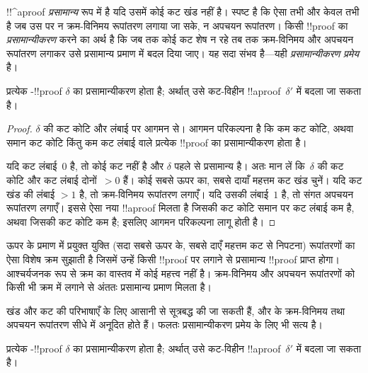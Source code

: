 \documentclass[../../../include/open-logic-section]{subfiles}
\begin{document}


!!^a{proof} \emph{प्रसामान्य} रूप में है यदि उसमें कोई कट खंड नहीं है। स्पष्ट
है कि ऐसा तभी और केवल तभी है जब उस पर न क्रम-विनिमय रूपांतरण लगाया जा सके, न
अपचयन रूपांतरण। किसी !!{proof} का \emph{प्रसामान्यीकरण} करने का अर्थ है कि
जब तक कोई कट शेष न रहे तब तक क्रम-विनिमय और अपचयन रूपांतरण लगाकर उसे
प्रसामान्य प्रमाण में बदल दिया जाए। यह सदा संभव है—यही \emph{प्रसामान्यीकरण
प्रमेय} है।

\begin{thm} प्रत्येक -!!{proof}
$\delta$ का प्रसामान्यीकरण होता है; अर्थात् उसे कट-विहीन
!!a{proof}~$\delta'$ में बदला जा सकता है।
\end{thm}

\begin{proof}
  $\delta$ की कट कोटि और लंबाई पर आगमन से। आगमन परिकल्पना है कि कम कट कोटि,
  अथवा समान कट कोटि किंतु कम कट लंबाई वाले प्रत्येक !!{proof} का
  प्रसामान्यीकरण होता है।

  यदि कट लंबाई~$0$ है, तो कोई कट नहीं है और $\delta$ पहले से प्रसामान्य है।
  अतः मान लें कि~$\delta$ की कट कोटि और कट लंबाई दोनों~$> 0$ हैं। कोई सबसे
  ऊपर का, सबसे दायाँ महत्तम कट खंड चुनें। यदि कट खंड की लंबाई $>1$ है, तो
  क्रम-विनिमय रूपांतरण लगाएँ। यदि उसकी लंबाई~$1$ है, तो संगत अपचयन रूपांतरण
  लगाएँ। इससे ऐसा नया !!a{proof} मिलता है जिसकी कट कोटि समान पर कट लंबाई कम
  है, अथवा जिसकी कट कोटि कम है; इसलिए आगमन परिकल्पना लागू होती है।
\end{proof}

ऊपर के प्रमाण में प्रयुक्त युक्ति (सदा सबसे ऊपर के, सबसे दाएँ महत्तम कट से
निपटना) रूपांतरणों का ऐसा विशेष क्रम सुझाती है जिसमें उन्हें किसी !!{proof}
पर लगाने से प्रसामान्य !!{proof} प्राप्त होगा। आश्चर्यजनक रूप से क्रम का
वास्तव में कोई महत्त्व नहीं है। क्रम-विनिमय और अपचयन रूपांतरणों को किसी भी
क्रम में लगाने से अंततः प्रसामान्य प्रमाण मिलता है।

खंड और कट की परिभाषाएँ  के लिए आसानी से सूत्रबद्ध की जा सकती हैं,
और  के क्रम-विनिमय तथा अपचयन रूपांतरण सीधे  में अनूदित
होते हैं। फलतः प्रसामान्यीकरण प्रमेय  के लिए भी सत्य है।

\begin{thm} प्रत्येक -!!{proof}
$\delta$ का प्रसामान्यीकरण होता है; अर्थात् उसे कट-विहीन
!!a{proof}~$\delta'$ में बदला जा सकता है।
\end{thm}
\end{document}
